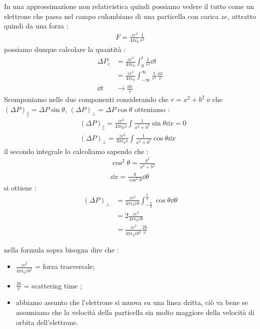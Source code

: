 In una approssimazione non relativistica quindi possiamo vedere il tutto come un elettrone che passa nel campo culombiano di una particella con
carica $\textit{z}e$, attratto quindi da una forza : 
\begin{align*}
    F = \frac{\textit{z}e^2}{4\pi\epsilon_{0}}\frac{1}{r^2}
\end{align*}
possiamo dunque calcolare la quantità : 
\begin{align*}
        \Delta P_{e} &= \frac{\textit{z}e^2}{4\pi\epsilon_{0}}\int^{t}_{0}\frac{1}{r^2}\dd{t} \\
                     &= \frac{\textit{z}e^2}{4\pi\epsilon_{0}}\int^{\infty}_{-\infty}\frac{1}{r^2}\frac{\dd{x}}{v} \\
        \dd{t} &\rightarrow \frac{\dd{x}}{v} \tag*{Poichè v costante}
\end{align*}
Scomponiamo nelle due componenti considerando che $r = x^2 + b^2$ e che $(\Delta P)_{\parallel} = \Delta P\sin{\theta}$, $(\Delta P)_{\perp} = \Delta P\cos{\theta}$
otteniamo : 
\begin{align*}
        &(\Delta P)_{\parallel} =  \frac{\textit{z}e^2}{4\pi\epsilon_{0}v}\int\frac{1}{x^2 + b^2}\sin{\theta}\dd{x} = 0 \\
        &(\Delta P)_{\perp} =  \frac{\textit{z}e^2}{4\pi\epsilon_{0}v}\int\frac{1}{x^2 + b^2}\cos{\theta}\dd{x}
\end{align*}
\newpage
il secondo integrale lo calcoliamo sapendo che : 
\begin{align*}
        &\cos^2{\theta} = \frac{b^2}{x^2 + b^2} \\
        &\dd{x} = \frac{b}{\cos^2{\theta}}\dd{\theta}
\end{align*}
si ottiene : 
\begin{align*}
        (\Delta P)_{\perp} &=  \frac{\textit{z}e^2}{4\pi\epsilon_{0}vb}\int^{\frac{\pi}{2}}_{-\frac{\pi}{2}}\cos{\theta}\dd{\theta} \\
                           &= 2\frac{\textit{z}e^2}{4\pi\epsilon_{0}vb} \\
                           &= \frac{\textit{z}e^2}{4\pi\epsilon_{0}vb^2}\frac{2b}{v}
\end{align*}
\begin{tcolorbox}[colback=red!5!white,colframe=red!50!black,title=ATTENZIONE !]
nella formula sopra bisogna dire che : 
\begin{itemize}
        \item $ \frac{\textit{z}e^2}{4\pi\epsilon_{0}vb^2}$ = forza trasversale; 
        \item $\frac{2b}{v}$ = scattering time ; 
        \item abbiamo assunto che l'elettrone si muova su una linea dritta, ciò va bene se assumiamo che la velocità della particella sia molto maggiore 
                della velocità di orbita dell'elettrone.
\end{itemize}
\end{tcolorbox}

